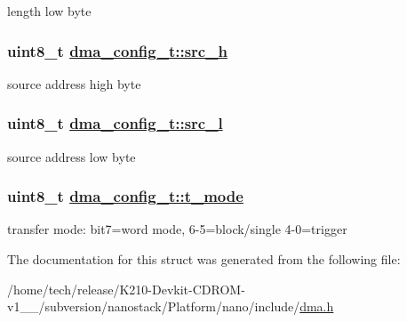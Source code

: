 length low byte \hypertarget{structdma__config__t_fb5908c7e14524a97700beaccd97ba53}{
\subsubsection[src\_\-h]{\setlength{\rightskip}{0pt plus 5cm}uint8\_\-t \hyperlink{structdma__config__t_fb5908c7e14524a97700beaccd97ba53}{dma\_\-config\_\-t::src\_\-h}}}
\label{structdma__config__t_fb5908c7e14524a97700beaccd97ba53}


source address high byte \hypertarget{structdma__config__t_df559811e53bbde7b6dc8cc6abb17e87}{
\subsubsection[src\_\-l]{\setlength{\rightskip}{0pt plus 5cm}uint8\_\-t \hyperlink{structdma__config__t_df559811e53bbde7b6dc8cc6abb17e87}{dma\_\-config\_\-t::src\_\-l}}}
\label{structdma__config__t_df559811e53bbde7b6dc8cc6abb17e87}


source address low byte \hypertarget{structdma__config__t_e41c35fc1ca1e6b7ddace92021656e4f}{
\subsubsection[t\_\-mode]{\setlength{\rightskip}{0pt plus 5cm}uint8\_\-t \hyperlink{structdma__config__t_e41c35fc1ca1e6b7ddace92021656e4f}{dma\_\-config\_\-t::t\_\-mode}}}
\label{structdma__config__t_e41c35fc1ca1e6b7ddace92021656e4f}


transfer mode: bit7=word mode, 6-5=block/single 4-0=trigger 

The documentation for this struct was generated from the following file:\begin{CompactItemize}
\item 
/home/tech/release/K210-Devkit-CDROM-v1\_\_/subversion/nanostack/Platform/nano/include/\hyperlink{dma_8h}{dma.h}\end{CompactItemize}
